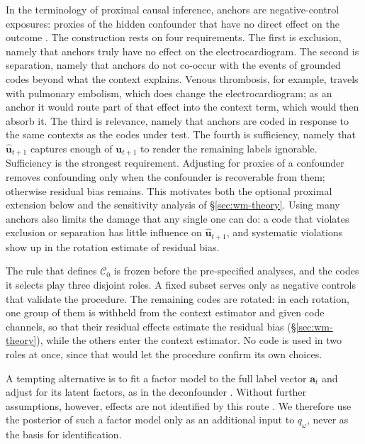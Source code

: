In the terminology of proximal causal inference, anchors are negative-control exposures: proxies of the hidden confounder that have no direct effect on the outcome \citep{lipsitch2010negative,shi2020negative,miao2018proxy,tchetgen2020proximal}. The construction rests on four requirements. The first is exclusion, namely that anchors truly have no effect on the electrocardiogram. The second is separation, namely that anchors do not co-occur with the events of grounded codes beyond what the context explains. Venous thrombosis, for example, travels with pulmonary embolism, which does change the electrocardiogram; as an anchor it would route part of that effect into the context term, which would then absorb it. The third is relevance, namely that anchors are coded in response to the same contexts as the codes under test. The fourth is sufficiency, namely that $\hat{\mathbf{u}}_{t+1}$ captures enough of $\mathbf{u}_{t+1}$ to render the remaining labels ignorable. Sufficiency is the strongest requirement. Adjusting for proxies of a confounder removes confounding only when the confounder is recoverable from them; otherwise residual bias remains. This motivates both the optional proximal extension below and the sensitivity analysis of \S\ref{sec:wm-theory}. Using many anchors also limits the damage that any single one can do: a code that violates exclusion or separation has little influence on $\hat{\mathbf{u}}_{t+1}$, and systematic violations show up in the rotation estimate of residual bias.

The rule that defines $\mathcal{C}_0$ is frozen before the pre-specified analyses, and the codes it selects play three disjoint roles. A fixed subset serves only as negative controls that validate the procedure. The remaining codes are rotated: in each rotation, one group of them is withheld from the context estimator and given code channels, so that their residual effects estimate the residual bias (\S\ref{sec:wm-theory}), while the others enter the context estimator. No code is used in two roles at once, since that would let the procedure confirm its own choices.

A tempting alternative is to fit a factor model to the full label vector $\mathbf{a}_t$ and adjust for its latent factors, as in the deconfounder \citep{wang2019blessings}. Without further assumptions, however, effects are not identified by this route \citep{damour2019multicause}. We therefore use the posterior of such a factor model only as an additional input to $q_\omega$, never as the basis for identification.


